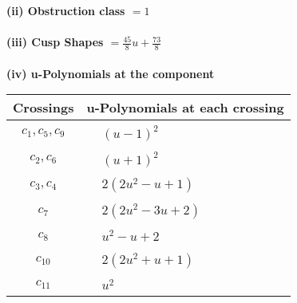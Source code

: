 \documentclass[1p]{elsarticle_modified}
\theoremstyle{definition}
\begin{document}
\flushleft \textbf{(ii) Obstruction class $= 1$}\\~\\
\flushleft \textbf{(iii) Cusp Shapes $= \frac{45}{8} u+\frac{73}{8}$}\\~\\
\newpage\renewcommand{\arraystretch}{1}
\flushleft \textbf{(iv) u-Polynomials at the component}\newline \\
\begin{tabular}{m{50pt}|m{274pt}}
Crossings & \hspace{64pt}u-Polynomials at each crossing \\
\hline $$\begin{aligned}c_{1},c_{5},c_{9}\end{aligned}$$&$\begin{aligned}
&(u-1)^2
\end{aligned}$\\
\hline $$\begin{aligned}c_{2},c_{6}\end{aligned}$$&$\begin{aligned}
&(u+1)^2
\end{aligned}$\\
\hline $$\begin{aligned}c_{3},c_{4}\end{aligned}$$&$\begin{aligned}
&2(2 u^2- u+1)
\end{aligned}$\\
\hline $$\begin{aligned}c_{7}\end{aligned}$$&$\begin{aligned}
&2(2 u^2-3 u+2)
\end{aligned}$\\
\hline $$\begin{aligned}c_{8}\end{aligned}$$&$\begin{aligned}
&u^2- u+2
\end{aligned}$\\
\hline $$\begin{aligned}c_{10}\end{aligned}$$&$\begin{aligned}
&2(2 u^2+u+1)
\end{aligned}$\\
\hline $$\begin{aligned}c_{11}\end{aligned}$$&$\begin{aligned}
&u^2
\end{aligned}$\\
\hline
\end{tabular}\\~\\
\end{document}
